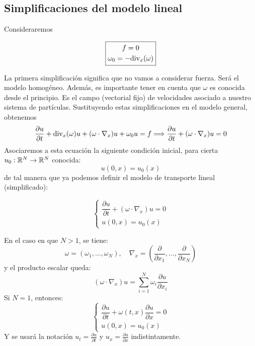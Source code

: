 \subsection{Simplificaciones del modelo lineal}

Consideraremos 

$$
\boxed{
\begin{gathered}
f = 0 \\
\omega_0 = -\text{div}_x(\omega)
\end{gathered}
}
$$

La primera simplificación significa que no vamos a considerar fuerza. Será el modelo homogéneo. Además, es importante
tener en cuenta que $\omega$ es conocida desde el principio. Es el campo (vectorial fijo) de velocidades asociado a nuestro sistema de partículas.
Sustituyendo estas simplificaciones en el modelo general, obtenemos
$$\dfrac{\partial u}{\partial t} + \text{div}_x(\omega) u + (\omega \cdot \nabla_x) u + \omega_0 u = f \Longrightarrow 
\dfrac{\partial u}{\partial t} + (\omega \cdot \nabla_x) u = 0$$
Asociaremos a esta ecuación la siguiente condición inicial, para cierta $u_0 : \mathbb{R}^N \to \mathbb{R}^N$ conocida:
$$u(0,x) = u_0(x)$$
de tal manera que ya podemos definir el modelo de transporte lineal (simplificado):

\begin{definicion}
    \begin{equation}\label{eq:ec3}
        \begin{cases}
            \dfrac{\partial u}{\partial t} + (\omega \cdot \nabla_x) u = 0 \\
            u(0,x) = u_0(x)
        \end{cases}
    \end{equation}
\end{definicion}

\begin{observacion}
    En el caso en que $N>1$, se tiene:
    $$\omega = (\omega_1, \ldots, \omega_N), \quad \nabla_x = \left( \dfrac{\partial}{\partial x_1}, \ldots, \dfrac{\partial}{\partial x_N} \right)$$
    y el producto escalar queda:
    $$(\omega \cdot \nabla_x)u = \sum_{i=1}^{N} \omega_i \dfrac{\partial u}{\partial x_i}$$
    Si $N=1$, entonces:
    \begin{equation*}
        \begin{cases}
            \dfrac{\partial u}{\partial t} + \omega(t,x) \dfrac{\partial u}{\partial x} = 0 \\
            u(0,x) = u_0(x)
        \end{cases}
    \end{equation*}
    Y se usará la notación $u_t = \frac{\partial u}{\partial t}$ y $u_x = \frac{\partial u}{\partial x}$ indistintamente.
\end{observacion}

